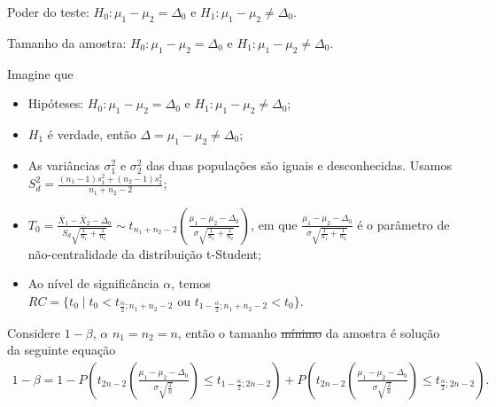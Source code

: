 \documentclass[9pt]{beamer}
\begin{document}
\begin{frame}{Poder do teste: $H_0:\mu_1 - \mu_2 = \Delta_0$ e $H_1: \mu_1 - \mu_2 \neq \Delta_0$.}
\normalsize

\end{frame}


\begin{frame}{Tamanho da amostra: $H_0:\mu_1 - \mu_2 = \Delta_0$ e $H_1: \mu_1 - \mu_2 \neq \Delta_0$.}

\footnotesize

Imagine que
\begin{itemize}
	\item Hipóteses: $H_0: \mu_1 - \mu_2 = \Delta_0$ e $H_1: \mu_1 -  \mu_2 \neq \Delta_0$;
	\item $H_1$ é verdade, então $\Delta = \mu_1-\mu_2 \neq \Delta_0$;
	\item As variâncias $\sigma_1^2$  e $\sigma_2^2$ das duas populações são iguais e desconhecidas. Usamos $S_d^2 = \frac{(n_1-1)s_1^2 + (n_2-1)s_2^2}{n_1+n_2-2}$;
	\item $T_0 = \frac{\bar{X}_1 - \bar{X}_2 - \Delta_0}{ S_d \sqrt{ \frac{1}{n_1} + \frac{1}{n_2} } } \sim t_{n_1+n_2-2}\left( \frac{\mu_1 - \mu_2 - \Delta_0}{\sigma \sqrt{\frac{1}{n_1} + \frac{1}{n_2}}} \right)$, em que $\frac{\mu_1 - \mu_2 - \Delta_0}{\sigma \sqrt{\frac{1}{n_1} + \frac{1}{n_2}}}$ é o parâmetro de não-centralidade da distribuição t-Student;
	\item Ao nível de significância $\alpha$, temos $RC = \{ t_0 \mid t_0 < t_{\frac{\alpha}{2};n_1+n_2-2} \mbox{ ou } t_{1-\frac{\alpha}{2};n_1+n_2-2} < t_0  \}$.
\end{itemize}
\vfill

Considere $1-\beta$, $\alpha$ $n_1=n_2=n$, então o tamanho \sout{mínimo} da amostra é solução da seguinte equação
\begin{align*}
1-\beta = 1 - P\left( t_{2n-2}\left( \frac{\mu_1 - \mu_2 - \Delta_0}{\sigma \sqrt{\frac{2}{n}}} \right) \leq t_{1-\frac{\alpha}{2};2n-2} \right) + P\left( t_{2n-2}\left( \frac{\mu_1 - \mu_2 - \Delta_0}{\sigma \sqrt{\frac{2}{n}}} \right) \leq t_{\frac{\alpha}{2};2n-2} \right).
\end{align*}

\normalsize
\end{frame}
\end{document}
